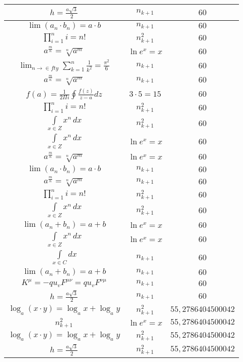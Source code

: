 \documentclass{article}
\begin{document}
\begin{flushleft}
\begin{longtable}{|c|c|c|}
$h=\frac{a\sqrt{3}}{2}$ & $n_{k+1}$ & $60$ \\ \hline 
$\lim\left(a_n\cdot b_n\right)=a\cdot b$ & $n_{k+1}$ & $60$ \\ \hline 
$\prod_{i=1}^ni=n!$ & $n_{k+1}^2$ & $60$ \\ \hline 
$a^{\frac{m}{n}}=\sqrt[n]{a^{m}}$ & $\ln e^x=x$ & $60$ \\ \hline 
$\lim_{n\to\in fty}\sum_{k=1}^n\frac{1}{k^2}=\frac{\pi^2}{6}$ & $n_{k+1}$ & $60$ \\ \hline 
$a^{\frac{m}{n}}=\sqrt[n]{a^{m}}$ & $n_{k+1}$ & $60$ \\ \hline 
$f\left(a\right)=\frac{1}{2\Pi i}\oint\frac{f\left(z\right)}{z-a}dz$ & $3\cdot 5=15$ & $60$ \\ \hline 
$\prod_{i=1}^ni=n!$ & $n_{k+1}^2$ & $60$ \\ \hline 
$\int \limits_{x\in Z}\!x^{n}\,dx$ & $n_{k+1}^2$ & $60$ \\ \hline 
$\int \limits_{x\in Z}\!x^{n}\,dx$ & $\ln e^x=x$ & $60$ \\ \hline 
$a^{\frac{m}{n}}=\sqrt[n]{a^{m}}$ & $\ln e^x=x$ & $60$ \\ \hline 
$\lim\left(a_n\cdot b_n\right)=a\cdot b$ & $n_{k+1}$ & $60$ \\ \hline 
$a^{\frac{m}{n}}=\sqrt[n]{a^{m}}$ & $n_{k+1}$ & $60$ \\ \hline 
$\prod_{i=1}^ni=n!$ & $n_{k+1}^2$ & $60$ \\ \hline 
$\int \limits_{x\in Z}\!x^{n}\,dx$ & $n_{k+1}^2$ & $60$ \\ \hline 
$\lim\left(a_n+b_n\right)=a+b$ & $\ln e^x=x$ & $60$ \\ \hline 
$\int \limits_{x\in Z}\!x^{n}\,dx$ & $\ln e^x=x$ & $60$ \\ \hline 
$\int \limits_{x\in C}dx$ & $n_{k+1}$ & $60$ \\ \hline 
$\lim\left(a_n+b_n\right)=a+b$ & $n_{k+1}$ & $60$ \\ \hline 
$K^\mu=-qu_vF^{\mu\nu}=qu_vF^{\nu\mu}$ & $n_{k+1}$ & $60$ \\ \hline 
$h=\frac{a\sqrt{3}}{2}$ & $n_{k+1}$ & $60$ \\ \hline 
$\log_{a}(x\cdot y)=\log_{a}x+\log_{a}y$ & $n_{k+1}^2$ & $55,2786404500042$ \\ \hline 
$n_{k+1}^2$ & $\ln e^x=x$ & $55,2786404500042$ \\ \hline 
$\log_{a}(x\cdot y)=\log_{a}x+\log_{a}y$ & $n_{k+1}^2$ & $55,2786404500042$ \\ \hline 
$h=\frac{a\sqrt{3}}{2}$ & $n_{k+1}^2$ & $55,2786404500042$ \\ \hline 

\end{longtable}
\end{flushleft}
\end{document}
